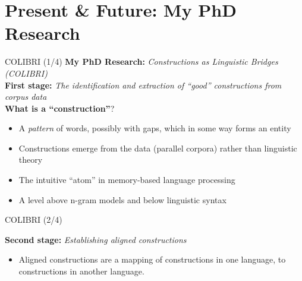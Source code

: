 \documentclass[compress]{beamer}
\begin{document}
\section{Present \& Future: My PhD Research}

\begin{frame}

	\begin{block}{COLIBRI (1/4)}
		\textbf{My PhD Research:} \emph{Constructions as Linguistic Bridges (COLIBRI)} \\

		\textbf{First stage:} \emph{The identification and extraction of ``good'' constructions from corpus data} \\

		\textbf{What is a ``construction''}? \\
		\begin{itemize}
			\item A \emph{pattern} of words, possibly with gaps, which in some way forms an entity
			\item Constructions emerge from the data (parallel corpora) rather than linguistic theory
			\item The intuitive ``atom'' in memory-based language processing
			\item A level above n-gram models and below linguistic syntax
		\end{itemize}

	\end{block}
\end{frame}


\begin{frame}

	\begin{block}{COLIBRI (2/4)}

		\textbf{Second stage:} \emph{Establishing aligned constructions} \\

		\begin{itemize}
			\item Aligned constructions are a mapping of constructions in one language, to constructions in another language.
		\end{itemize}

	\end{block}

\end{frame}
\end{document}
